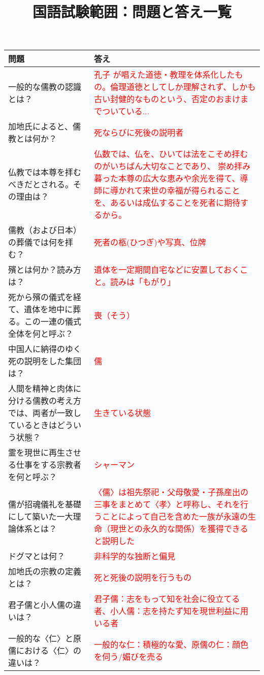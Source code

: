 \documentclass[a4paper,10pt]{article}
\title{国語試験範囲：問題と答え一覧}
\date{}
\begin{document}
\maketitle

\begin{longtable}{|p{}|p{}|}
\hline
\textbf{問題} & \textbf{答え} \\ \hline
一般的な儒教の認識とは？ & \textcolor{red}{孔子 が唱えた道徳・教理を体系化したもの。倫理道徳としてしか理解されず、しかも古い封健的なものという、否定のおまけまでついている...} \\ \hline
加地氏によると、儒教とは何か？ & \textcolor{red}{死ならびに死後の説明者} \\ \hline
仏教では本尊を拝むべきだとされる。その理由は？ & \textcolor{red}{仏数では、仏を、ひいては法をこそめ拝むのがいちばん大切なことであり、
崇め拝み暮った本尊の広大な恵みや余光を得て、導師に導かれて来世の幸福が得られることを、あるいは成仏することを死者に期待するから。} \\ \hline
儒教（および日本）の葬儀では何を拝む？ & \textcolor{red}{死者の柩(ひつぎ)や写真、位牌} \\ \hline
殯とは何か？読み方は？ & \textcolor{red}{遺体を一定期間自宅などに安置しておくこと。読みは「もがり」} \\ \hline
死から殯の儀式を経て、遺体を地中に葬る。この一連の儀式全体を何と呼ぶ？ & \textcolor{red}{喪（そう）} \\ \hline
中国人に納得のゆく死の説明をした集団は？ & \textcolor{red}{儒} \\ \hline
人間を精神と肉体に分ける儒教の考え方では、両者が一致しているときはどういう状態？ & \textcolor{red}{生きている状態} \\ \hline
霊を現世に再生させる仕事をする宗教者を何と呼ぶ？ & \textcolor{red}{シャーマン} \\ \hline
儒が招魂儀礼を基礎にして築いた一大理論体系とは？ & \textcolor{red}{〈儒〉は祖先祭祀・父母敬愛・子孫産出の三事をまとめて〈孝〉と呼称し、それを行うことによって自己を含めた一族が永遠の生命（現世との永久的な関係）を獲得できると説明した} \\ \hline
ドグマとは何？ & \textcolor{red}{非科学的な独断と偏見} \\ \hline
加地氏の宗教の定義とは？ & \textcolor{red}{死と死後の説明を行うもの} \\ \hline
君子儒と小人儒の違いは？ & \textcolor{red}{君子儒：志をもって知を社会に役立てる者、小人儒：志を持たず知を現世利益に用いる者} \\ \hline
一般的な〈仁〉と原儒における〈仁〉の違いは？ & \textcolor{red}{一般的な仁：積極的な愛、原儒の仁：顔色を伺う/媚びを売る} \\ \hline

\end{longtable}
\end{document}
